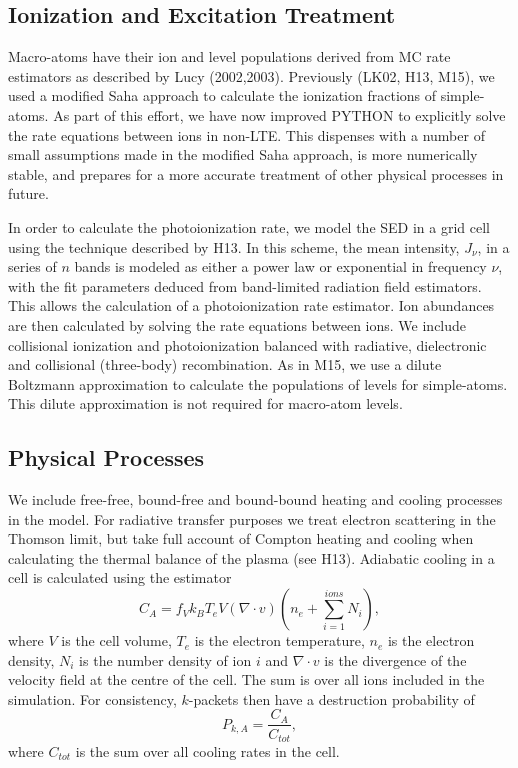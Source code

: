 \documentclass[useAMS,usenatbib]{mn2e_x}
\begin{document}
\subsection{Ionization and Excitation Treatment}

Macro-atoms have their ion and level populations derived from
MC rate estimators as described by Lucy (2002,2003). 
Previously (LK02, H13, M15), we used a modified Saha approach to 
calculate the ionization fractions
of simple-atoms. As part of  this effort, we have 
now improved {\sc PYTHON} to explicitly solve the 
rate equations between ions in non-LTE. This dispenses with a number of small assumptions 
made in the modified Saha approach, is more numerically stable, and
prepares for a more accurate treatment of other physical processes in future. 

In order to calculate the photoionization rate, 
we model the SED in a grid cell using the technique described by H13. In this scheme,
the mean intensity, $J_{\nu}$, in a series of $n$ bands is modeled as either a power law or exponential
in frequency $\nu$, with the fit parameters deduced from band-limited radiation field estimators.
This allows the calculation of a photoionization rate estimator. Ion abundances are
then calculated by solving the rate equations between ions. We include collisional ionization and photoionization balanced with radiative, 
dielectronic and collisional (three-body) recombination.
As in M15, we use a dilute Boltzmann approximation to calculate 
the populations of levels for simple-atoms. This dilute approximation 
is not required for macro-atom levels. 

\subsection{Physical Processes}

We include  free-free, bound-free and bound-bound heating
and cooling processes in the model. 
For radiative transfer purposes
we treat electron scattering in the Thomson limit, 
but take full account of Compton heating and cooling when
calculating the thermal balance of the plasma (see H13).
Adiabatic cooling in a cell is calculated using the estimator
\begin{equation}
C_{A} = f_V k_B T_e V (\nabla \cdot v) \left(n_e + \sum\limits_{i=1}^{ions} N_i\right),
\end{equation}
where $V$ is the cell volume, $T_e$ is the electron temperature,
$n_e$ is the electron density, $N_i$ is the number density of ion $i$
and $\nabla \cdot v$ is the divergence of the 
velocity field at the centre of the cell. The sum is over all ions 
included in the simulation.
For consistency, $k$-packets then have a destruction probability of 
\begin{equation}
P_{k,A} = \frac{C_{A}}{C_{tot}},
\end{equation}
where $C_{tot}$ is the sum over all cooling rates in the cell.
\end{document}

